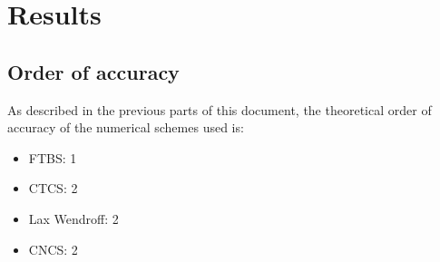 

\section{Results}

\subsection{Order of accuracy}
As described in the previous parts of this document, the theoretical order of accuracy of the numerical schemes used is:
\begin{itemize}
	\item FTBS: 1
	\item CTCS: 2
	\item Lax Wendroff: 2
	\item CNCS: 2
\end{itemize}

